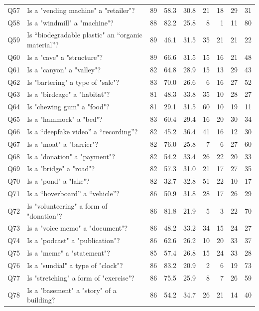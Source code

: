 \begin{scriptsize}
\begin{longtable}{lp{}rrrrrrr}
Q57 & Is a "vending machine" a "retailer"? & 89 & 58.3 & 30.8 & 21 & 18 & 29 & 31 \\
Q58 & Is a "windmill" a "machine"? & 88 & 82.2 & 25.8 & 8 & 1 & 11 & 80 \\
Q59 & Is ``biodegradable plastic" an ``organic material''? & 89 & 46.1 & 31.5 & 35 & 21 & 21 & 22 \\
Q60 & Is a "cave" a "structure"? & 89 & 66.6 & 31.5 & 15 & 16 & 21 & 48 \\
Q61 & Is a "canyon" a "valley"? & 82 & 64.8 & 28.9 & 15 & 13 & 29 & 43 \\
Q62 & Is "bartering" a type of "sale"? & 83 & 70.0 & 26.6 & 6 & 16 & 27 & 52 \\
Q63 & Is a "birdcage" a "habitat"? & 81 & 48.3 & 33.8 & 35 & 10 & 28 & 27 \\
Q64 & Is "chewing gum" a "food"? & 81 & 29.1 & 31.5 & 60 & 10 & 19 & 11 \\
Q65 & Is a "hammock" a "bed"? & 83 & 60.4 & 29.4 & 16 & 20 & 30 & 34 \\
Q66 & Is a ``deepfake video'' a ``recording''? & 82 & 45.2 & 36.4 & 41 & 16 & 12 & 30 \\
Q67 & Is a "moat" a "barrier"? & 82 & 76.0 & 25.8 & 7 & 6 & 27 & 60 \\
Q68 & Is a "donation" a "payment"? & 82 & 54.2 & 33.4 & 26 & 22 & 20 & 33 \\
Q69 & Is a "bridge" a "road"? & 82 & 57.3 & 31.0 & 21 & 17 & 27 & 35 \\
Q70 & Is a "pond" a "lake"? & 82 & 32.7 & 32.8 & 51 & 22 & 10 & 17 \\
Q71 & Is a ``hoverboard'' a ``vehicle''? & 86 & 50.9 & 31.8 & 28 & 17 & 26 & 29 \\
Q72 & Is "volunteering" a form of "donation"? & 86 & 81.8 & 21.9 & 5 & 3 & 22 & 70 \\
Q73 & Is a "voice memo" a "document"? & 86 & 48.2 & 33.2 & 34 & 15 & 24 & 27 \\
Q74 & Is a "podcast" a "publication"? & 86 & 62.6 & 26.2 & 10 & 20 & 33 & 37 \\
Q75 & Is a "meme" a "statement"? & 85 & 57.4 & 26.8 & 15 & 24 & 33 & 28 \\
Q76 & Is a "sundial" a type of "clock"? & 86 & 83.2 & 20.9 & 2 & 6 & 19 & 73 \\
Q77 & Is "stretching" a form of "exercise"? & 86 & 75.5 & 25.9 & 8 & 7 & 26 & 59 \\
Q78 & Is a "basement" a "story" of a building? & 86 & 54.2 & 34.7 & 26 & 21 & 14 & 40 \\

\end{longtable}
\end{scriptsize}
